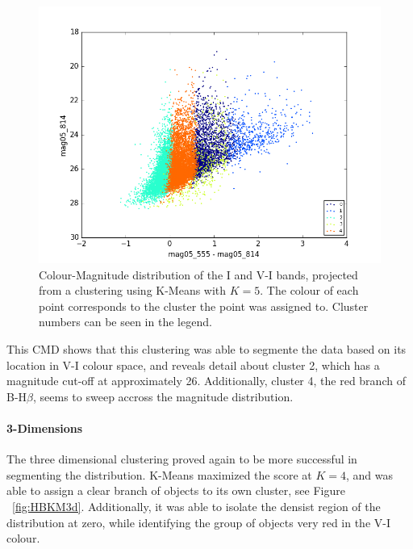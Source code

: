 \begin{figure}
\centering
\includegraphics[width=\linewidth]{figs/kmeans_CMD_5cl_mag05_555-mag05_814vsmag05_814}
\caption{Colour-Magnitude distribution of the I and V-I bands, projected from a clustering using K-Means with $K=5$. The colour of each point corresponds to the cluster the point was assigned to. Cluster numbers can be seen in the legend.}
\label{fig:HBCMD}
\end{figure}

This CMD shows that this clustering was able to segmente the data based on its location in V-I colour space, and reveals detail about cluster 2, which has a magnitude cut-off at approximately 26.
Additionally, cluster 4, the red branch of B-H$\beta$, seems to sweep accross the magnitude distribution. %

\paragraph{3-Dimensions}
The three dimensional clustering proved again to be more successful in segmenting the distribution. 
K-Means maximized the score at $K=4$, and was able to assign a clear branch of objects to its own cluster, see Figure ~\ref{fig:HBKM3d}.
Additionally, it was able to isolate the densist region of the distribution at zero, while identifying the group of objects very red in the V-I colour.

